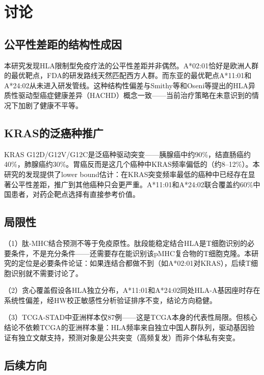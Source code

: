 \documentclass[12pt,a4paper]{ctexart}
\begin{document}

\section{讨论}

\subsection{公平性差距的结构性成因}

本研究发现HLA限制型免疫疗法的公平性差距并非偶然。A*02:01恰好是欧洲人群的最优靶点，FDA的研发路线天然匹配西方人群。而东亚的最优靶点A*11:01和A*24:02从未进入研发管线。这种结构性偏差与Smithy等\cite{ref12}和Oseni等\cite{ref13}提出的HLA异质性驱动型癌症健康差异（HACHD）概念一致——当前治疗策略在未意识到的情况下加剧了健康不平等。

\subsection{KRAS的泛癌种推广}

KRAS G12D/G12V/G12C是泛癌种驱动突变——胰腺癌中约90\%，结直肠癌约40\%，肺腺癌约30\%。胃癌反而是这几个癌种中KRAS频率偏低的（约8--12\%）。本研究的发现提供了lower bound估计：在KRAS突变频率最低的癌种中已经存在显著公平性差距，推广到其他癌种只会更严重\cite{ref11}。A*11:01和A*24:02联合覆盖约60\%中国患者，对药企靶点选择有直接参考价值。

\subsection{局限性}

（1）肽-MHC结合预测不等于免疫原性。肽段能稳定结合HLA是T细胞识别的必要条件，不是充分条件——还需要存在能识别该pMHC复合物的T细胞克隆\cite{ref14,ref15}。本研究的定位是必要条件论证：如果连结合都做不到（如A*02:01对KRAS），后续T细胞识别就不需要讨论了。

（2）贪心覆盖假设各HLA独立分布，A*11:01和A*24:02同处HLA-A基因座时存在系统性偏差，经HW校正敏感性分析验证排序不变，结论方向稳健。

（3）TCGA-STAD中亚洲样本仅87例\cite{ref3}——这是TCGA本身的代表性局限。但核心结论不依赖TCGA的亚洲样本量：HLA频率来自独立中国人群队列\cite{ref9}，驱动基因验证有独立文献支持，预测对象是公共突变（高频复发）而非个体私有突变。

\subsection{后续方向}
\end{document}
